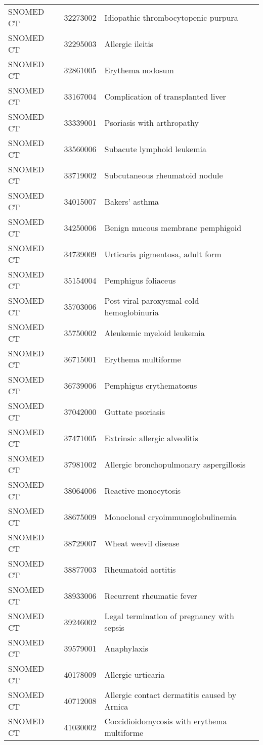 \begin{longtable}{p{}p{}p{}}
  SNOMED CT & 32273002 & Idiopathic thrombocytopenic purpura \\ 
  SNOMED CT & 32295003 & Allergic ileitis \\ 
  SNOMED CT & 32861005 & Erythema nodosum \\ 
  SNOMED CT & 33167004 & Complication of transplanted liver \\ 
  SNOMED CT & 33339001 & Psoriasis with arthropathy \\ 
  SNOMED CT & 33560006 & Subacute lymphoid leukemia \\ 
  SNOMED CT & 33719002 & Subcutaneous rheumatoid nodule \\ 
  SNOMED CT & 34015007 & Bakers' asthma \\ 
  SNOMED CT & 34250006 & Benign mucous membrane pemphigoid \\ 
  SNOMED CT & 34739009 & Urticaria pigmentosa, adult form \\ 
  SNOMED CT & 35154004 & Pemphigus foliaceus \\ 
  SNOMED CT & 35703006 & Post-viral paroxysmal cold hemoglobinuria \\ 
  SNOMED CT & 35750002 & Aleukemic myeloid leukemia \\ 
  SNOMED CT & 36715001 & Erythema multiforme \\ 
  SNOMED CT & 36739006 & Pemphigus erythematosus \\ 
  SNOMED CT & 37042000 & Guttate psoriasis \\ 
  SNOMED CT & 37471005 & Extrinsic allergic alveolitis \\ 
  SNOMED CT & 37981002 & Allergic bronchopulmonary aspergillosis \\ 
  SNOMED CT & 38064006 & Reactive monocytosis \\ 
  SNOMED CT & 38675009 & Monoclonal cryoimmunoglobulinemia \\ 
  SNOMED CT & 38729007 & Wheat weevil disease \\ 
  SNOMED CT & 38877003 & Rheumatoid aortitis \\ 
  SNOMED CT & 38933006 & Recurrent rheumatic fever \\ 
  SNOMED CT & 39246002 & Legal termination of pregnancy with sepsis \\ 
  SNOMED CT & 39579001 & Anaphylaxis \\ 
  SNOMED CT & 40178009 & Allergic urticaria \\ 
  SNOMED CT & 40712008 & Allergic contact dermatitis caused by Arnica \\ 
  SNOMED CT & 41030002 & Coccidioidomycosis with erythema multiforme \\ 

\end{longtable}
